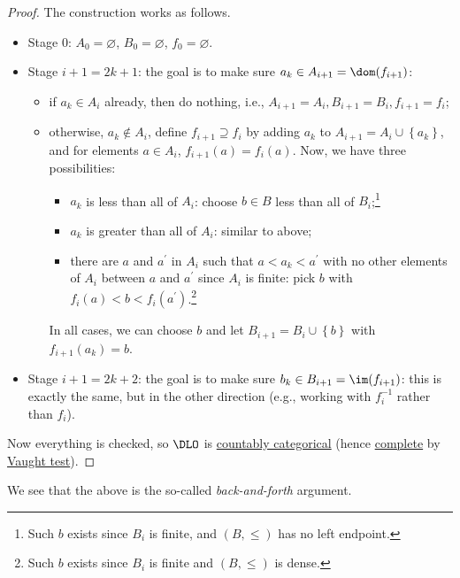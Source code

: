 \begin{proof}
	The construction works as follows.
	\begin{itemize}
		\item Stage \(0\): \(A_0 = \varnothing \), \(B_0 = \varnothing \), \(f_0 = \varnothing \).
		\item Stage \(i+1=2k+1\): the goal is to make sure \(a_k\in A_{i+1} = \dom(f_{i+1} )\):
		      \begin{itemize}
			      \item if \(a_k \in A_i\) already, then do nothing, i.e., \(A_{i+1} = A_i, B_{i+1} = B_i, f_{i+1} = f_i\);
			      \item otherwise, \(a_k \notin A_i\), define \(f_{i+1} \supseteq f_i \) by adding \(a_k\) to \(A_{i+1} = A_i \cup \left\{ a_k \right\} \), and for elements \(a\in A_i\), \(f_{i+1} (a) = f_i (a)\). Now, we have three possibilities:
			            \begin{itemize}
				            \item \(a_k\) is less than all of \(A_i\): choose \(b\in B\) less than all of \(B_i\);\footnote{Such \(b\) exists since \(B_i\) is finite, and \((B, \leq )\) has no left endpoint.}
				            \item \(a_k\) is greater than all of \(A_i\): similar to above;
				            \item there are \(a\) and \(a^\prime \) in \(A_i\) such that \(a < a_k < a^\prime \) with no other elements of \(A_i\) between \(a\) and \(a^\prime \) since \(A_i\) is finite: pick \(b\) with \(f_i(a) < b < f_i(a^\prime )\).\footnote{Such \(b\) exists since \(B_i\) is finite and \((B, \leq )\) is dense.}
			            \end{itemize}
			            In all cases, we can choose \(b\) and let \(B_{i+1} = B_i \cup \left\{ b \right\} \) with \(f_{i+1}(a_k) = b\).
		      \end{itemize}
		\item Stage \(i+1 = 2k+2\): the goal is to make sure \(b_k\in B_{i+1} = \im(f_{i+1} )\): this is exactly the same, but in the other direction (e.g., working with \(f_i ^{-1} \) rather than \(f_i\)).
	\end{itemize}
	Now everything is checked, so \(\DLO\) is \hyperref[def:countably-categorical]{countably categorical} (hence \hyperref[def:theory-complete]{complete} by \hyperref[thm:Vaught-test]{Vaught test}).
\end{proof}

\begin{note}\label{not:back-and-forth}
	We see that the above is the so-called \emph{back-and-forth} argument.
\end{note}


